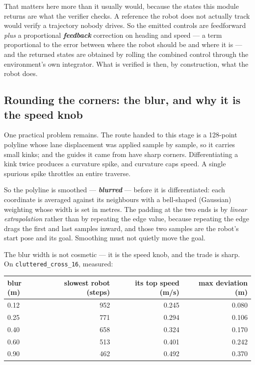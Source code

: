 \documentclass[11pt,a4paper]{article}
\newcommand{\defn}[1]{\textbf{\textit{#1}}}
\begin{document}
That matters here more than it usually would, because the states this module returns are
what the verifier checks. A reference the robot does not actually track would verify a
trajectory nobody drives. So the emitted controls are feedforward \emph{plus} a
proportional \defn{feedback} correction on heading and speed --- a term proportional to the
error between where the robot should be and where it is --- and the returned states are
obtained by rolling the combined control through the environment's own integrator. What is
verified is then, by construction, what the robot does.

\subsection{Rounding the corners: the blur, and why it is the speed knob}

One practical problem remains. The route handed to this stage is a 128-point polyline whose
lane displacement was applied sample by sample, so it carries small kinks; and the guides it
came from have sharp corners. Differentiating a kink twice produces a curvature spike, and
curvature caps speed. A single spurious spike throttles an entire traverse.

So the polyline is smoothed --- \defn{blurred} --- before it is differentiated: each
coordinate is averaged against its neighbours with a bell-shaped (Gaussian) weighting whose
width is set in metres. The padding at the two ends is by \emph{linear extrapolation} rather
than by repeating the edge value, because repeating the edge drags the first and last
samples inward, and those two samples are the robot's start pose and its goal. Smoothing
must not quietly move the goal.

The blur width is not cosmetic --- it is the speed knob, and the trade is sharp. On
\texttt{cluttered\_cross\_16}, measured:

\begin{center}
\begin{tabular}{lrrr}
\toprule
blur (m) & slowest robot (steps) & its top speed (m/s) & max deviation (m) \\
\midrule
0.12 & 952 & 0.245 & 0.080 \\
0.25 & 771 & 0.294 & 0.106 \\
0.40 & 658 & 0.324 & 0.170 \\
0.60 & 513 & 0.401 & 0.242 \\
0.90 & 462 & 0.492 & 0.370 \\
\bottomrule
\end{tabular}
\end{center}
\end{document}
